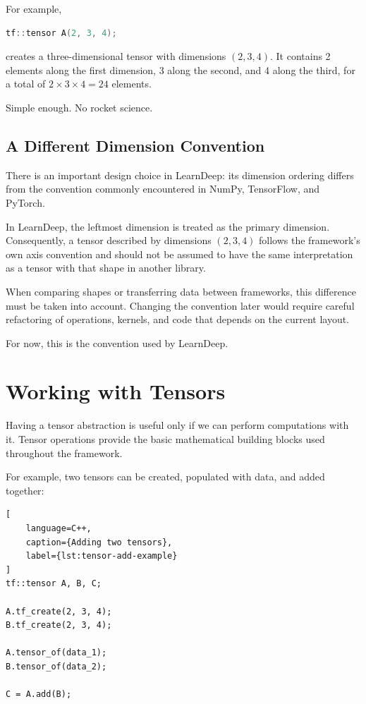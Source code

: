For example,

\begin{lstlisting}[language=C++, caption={Creating a three-dimensional tensor}]
tf::tensor A(2, 3, 4);
\end{lstlisting}

creates a three-dimensional tensor with dimensions \((2,3,4)\). It contains 2 elements along the first dimension, 3 along the second, and 4 along the third, for a total of \(2 \times 3 \times 4 = 24\) elements.

Simple enough. No rocket science.

\subsection{A Different Dimension Convention}

There is an important design choice in LearnDeep: its dimension ordering differs from the convention commonly encountered in NumPy, TensorFlow, and PyTorch.

In LearnDeep, the leftmost dimension is treated as the primary dimension. Consequently, a tensor described by dimensions \((2,3,4)\) follows the framework's own axis convention and should not be assumed to have the same interpretation as a tensor with that shape in another library.

When comparing shapes or transferring data between frameworks, this difference must be taken into account. Changing the convention later would require careful refactoring of operations, kernels, and code that depends on the current layout.

For now, this is the convention used by LearnDeep.

\section{Working with Tensors}

Having a tensor abstraction is useful only if we can perform computations with it. Tensor operations provide the basic mathematical building blocks used throughout the framework.

For example, two tensors can be created, populated with data, and added together:

\begin{lstlisting}[
    language=C++,
    caption={Adding two tensors},
    label={lst:tensor-add-example}
]
tf::tensor A, B, C;

A.tf_create(2, 3, 4);
B.tf_create(2, 3, 4);

A.tensor_of(data_1);
B.tensor_of(data_2);

C = A.add(B);
\end{lstlisting}

